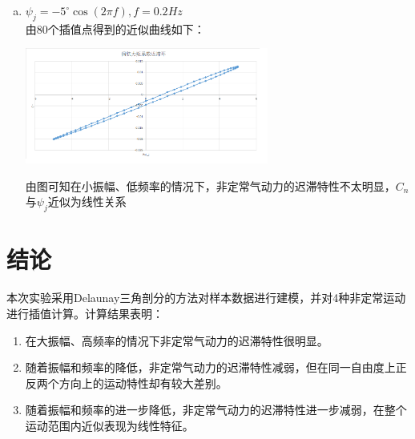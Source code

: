 \documentclass[UTF8]{ctexart}
\begin{document}
\begin{enumerate}[a)]
\item $\psi_j=-5^\circ \cos(2\pi f), f=0.2Hz$ \\ 
\indent 由80个插值点得到的近似曲线如下：
\begin{center}
\includegraphics[width=8cm]{../results/case4.png}
\end{center}
\indent 由图可知在小振幅、低频率的情况下，非定常气动力的迟滞特性不太明显，$C_n$与$\psi_j$近似为线性关系

\end{enumerate}

\section{结论}
本次实验采用Delaunay三角剖分的方法对样本数据进行建模，并对4种非定常运动进行插值计算。计算结果表明：
\begin{enumerate}[(1)]
\item 在大振幅、高频率的情况下非定常气动力的迟滞特性很明显。
\item 随着振幅和频率的降低，非定常气动力的迟滞特性减弱，但在同一自由度上正反两个方向上的运动特性却有较大差别。
\item 随着振幅和频率的进一步降低，非定常气动力的迟滞特性进一步减弱，在整个运动范围内近似表现为线性特征。
\end{enumerate}

\clearpage


\end{document}
